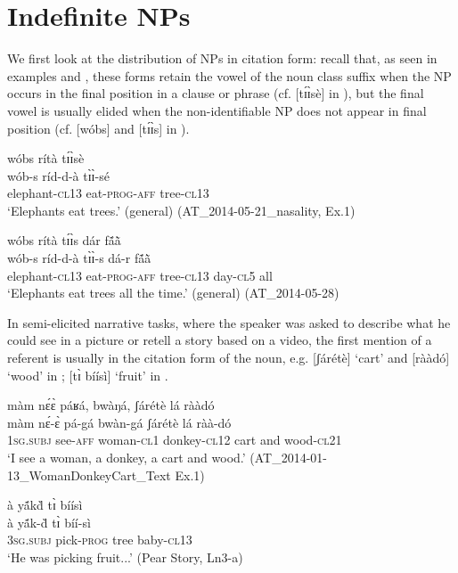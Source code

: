 \documentclass[output=paper]{langsci/langscibook}
\begin{document}
\section{Indefinite NPs}\label{sec:teo:5}

We first look at the distribution of NPs in citation form: recall that, as seen in examples  and , these forms retain the vowel of the noun class suffix when the NP occurs in the final position in a clause or phrase (cf. [t\'ɪ\`ɪsè] in ), but the final vowel is usually elided when the non-identifiable NP does not appear in final position (cf. [wóbs] and [t\'ɪ\`ɪs] in ).

\ea\label{ex:teo:26}
\glll wóbs rítà t\'ɪ\`ɪsè\\
 wób-s ríd-d-à t\`ɪ\`ɪ-sé\\
elephant-\textsc{cl13} eat-\textsc{prog-aff} tree-\textsc{cl13}\\
\glt ‘Elephants eat trees.’ (general) (AT\_2014-05-21\_nasality, Ex.1)
\z

\ea\label{ex:teo:27}
\glll wóbs rítà t\'ɪ\`ɪs dár f\'{ã}\`{ã}\\
 wób-s ríd-d-à t\`ɪ\`ɪ-s dá-r f\'{ã}\`{ã}\\
elephant-\textsc{cl13} eat-\textsc{prog-aff} tree-\textsc{cl13} day-\textsc{cl5} all\\
\glt ‘Elephants eat trees all the time.’ (general) (AT\_2014-05-28)
\z

In semi-elicited narrative tasks, where the speaker was asked to describe what he could see in a picture or retell a story based on a video, the first mention of a referent is usually in the citation form of the noun, e.g. [ʃárétè] ‘cart’ and [rààdó] ‘wood’ in ; [t\`ɪ bíísì] ‘fruit’ in .

\ea\label{ex:teo:28}
\glll màm n\'ɛ\`ɛ páʁá, bwàŋá, ʃárétè lá rààdó\\
 màm n\'ɛ-\`ɛ pá-gá bwàn-gá ʃárétè lá ràà-dó\\
1\textsc{sg.subj} see-\textsc{aff} woman-\textsc{cl1} donkey-\textsc{cl12} cart and wood-\textsc{cl21}\\
\glt ‘I see a woman, a donkey, a cart and wood.’ (AT\_2014-01-13\_WomanDonkeyCart\_Text Ex.1)
\z

\ea\label{ex:teo:29}
\glll à y\'{ã}k\`{d} t\`ɪ bíísì\\
 à y\'{ã}k-\`{d}{\rmfnm} t\`ɪ bíí-sì\\
3\textsc{sg.subj} pick-\textsc{prog} tree baby-\textsc{cl13}\\
\glt ‘He was picking fruit...’ (Pear Story, Ln3-a)
\z
\end{document}
